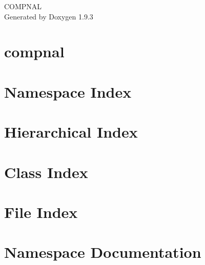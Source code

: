 \documentclass[twoside]{book}
\newcommand{\+}{\discretionary{\mbox{\scriptsize$\hookleftarrow$}}{}{}}
\newcommand{\clearemptydoublepage}{%
    \newpage{\pagestyle{empty}\cleardoublepage}%
  }
\begin{document}
  \raggedbottom
    \hypersetup{pageanchor=false,
                bookmarksnumbered=true,
                pdfencoding=unicode
               }
  \begin{titlepage}
  \vspace*{7cm}
  \begin{center}%
  {\Large COMPNAL}\\
  \vspace*{1cm}
  {\large Generated by Doxygen 1.9.3}\\
  \end{center}
  \end{titlepage}
  \clearemptydoublepage
  \tableofcontents
  \clearemptydoublepage
  \hypersetup{pageanchor=true}
\chapter{compnal}
\label{index}\hypertarget{index}{}
\chapter{Namespace Index}

\chapter{Hierarchical Index}

\chapter{Class Index}

\chapter{File Index}

\chapter{Namespace Documentation}






\end{document}
